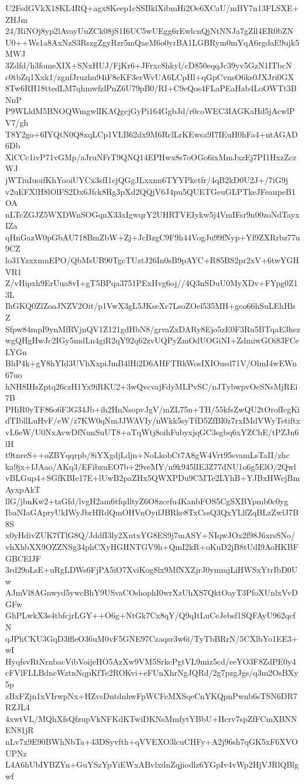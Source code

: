 U2FsdGVkX18KL4RQ+agx8Keep1cSSBklXibmHi2Oe6XCaU/mBY7n13FLSXE+ZHJm
24/RiNOj8yp2lAvayUuZCk08jS1I6UC5wUEgg6rEwlcnQjNtNNJa7gZll4ER0bZN
U0++Ws1a8AxNzS3RszgZgyRzr5mQaeM6o0yrBA1LGBRym0mYqA6rgdaE9ujk5MWJ
3Zdfd/h3fomeXIX+SNxHUJ/FjKr6+JFrxc8hkyl/cD850eqqJc39yv5GzN1ITbcN
c0tbZq1Xxk1/zgnfJruzhu94iF8eKF3erWvUA6LCpHl+qGpCvnsO6ks0JXJri0GX
8Tw6RH18ttedLM7qhmwfzlPnZ6U79pB0/RI+C9eQos4FLaPEaHab4LoOWTt3BNnP
P9WLldM5BNOQWmgwlIKAQgcjGyPi164GgbJd/r0coWEC3IAGKaHd5jAcwlPV7/gh
T8Y2go+6IYQtN0Q8xqLCp1VLB62dx9M6RclLrKEwsa9I7IEuH0hFa4+ntAGAD6Db
XlCCc1ivP71vGMp/aJruNFrT9QNQ14EPHwx8s7oOGo6ixMmJxzEj7PI1HxzZczWJ
jWTiuIuoifKhYooiUYCx3sfI1cjQGgJLxxnn6TYYPkctfr/4qB2kD0U2J+/7iG9j
v2uEFXlH8lOlFS2Dx6Jfck8Rg3pXd2QQjV6J4pu5QUETGeuGLPTkeJFeaupeB1OA
nLTcZGJZ5WXDWnSOGqnX33xIgwqrY2UHRTVEIykw5j4VmIFsr9n00zoNdTayxIZa
qHnGazW0pGbAU718BmZbW+Zj+JcBzgC9F9h44VogJu99fNyp+Yf9ZXRrbz77u9CZ
lo31YzxxmnEPO/QbMsUB90TgcTUztJ26In0sB9pAYC+R85BS2pr2xV+6twYGHVR1
Z/vHipxh9ErUua8vI+gT5BPqa3751PExHvg6oj//4Q3nSDuU0MyXDv+FYpg0Z13L
IhGKQ0ZlZoaJNZV2Oit/p1VwX3gL5JKseXc7LsoZOel535MH+gco66hSuLEhHlsZ
Sfpw84mpI9ynMfRVjnQV1Z121gdHbN8/grvaZxDARy8Ejo5zE0F3Ru5BTqaE3hez
wgQHgHwJc2IGy5mdLn4giR2qY92q62zvUQPyZmOdUOGiNI+ZdmiwGOi83FCeLYGn
BhP4k+gY8hYId3UVhXxpiJmB4lHi2D6AHFTRkWosIXIOusd71V/OlmI4wEWn67uo
hNH8IHsZptq26czH1Yx9iRKU2+3wQvcvajFdyMLPvSC/nJTybwpvOeSNsMjREi7B
PHiR0yTF86o6F3G34Jb+ih2HnNsopvJgV/mZL75n+TH/55kfsZwQU2tOrofIcgKi
dTIbllLuHvF/eW/z7KW0qNmJJWAVIy/nWkk5syTfD5ZfBl0z7rxIMdVWyTetiftx
vL6eW/U0NxAvwDfNunSuUT8+aTqWtj8oihFubyxjqGC3sgbq6xYZChE/tPZJn6lH
t9tnreS++oZBYqqrpb/8iYXgdjLdjn+NoLkobCt7A8gW4Vrt95svamLsTaII/zhc
ka9jx+IJAao/AKq3/EFibzuEO7b+29veMY/n9k945lIE3Z77dNU1o6g5ElO/2Qwl
vBLGup4+SGfKBIe17E+lUwB2paZHx5QWXPDu9CMTe2LYhB+YJBxHWcjBmAyxpAkT
llG/jbnKw2+tzGfd/lvgH2am6tfqdltyZ6O8zcefu4KanbFOS5CgSXBYpmb0c0yg
IbaNIaGApryUkIWyJbrHRdQmOHVnOyifJBRke8TxCssQ3QxYLlfZqBLzZwlJ7B8S
x0yHdivZUK7fTlG8Q/JddfI3ly2XutxYG8ES9j7mASY+NIqwJOx2f98J6xrsSNo/
vhXhbXX9OZZNSg34phCXyHGHNTGV9h+QmI2kR+oKuD2jB8tUdI9AoHKBFGBCElJF
3rd29oLsE+uRgLDWs6FjPA5iO7XviKog8lx9MfNXZjrJ0ymmjLiHWSxYtrIbD0Uw
AJmVl8AGnwyd5ywcBhY9USvaCOshophI0wrXzUhXS7QktOayT3PfoXUnlxVvDGFw
GhPLwkX3s4tbfcjrLGY++O6g+NtGk7Cx8qY/Q9qItLuCeJebsf1SQFAyU962qcfN
qJPhCKU3GqD3ffleO36uM0vF5GNE97Czaqsr3w6i/TyTbBRrN/5CXlbYo1EE3+wI
HyqfsvRtNrnbacVibVoijeHO5AzXw9VM5SrkcPgtVL9miz5cd/eeYO3F8ZdPE0y4
cFVlFLLBdncWztnNqpKfTe2ROKvi+eFUnXhrNgJQRd/2g7pzgJgs/q3m2OsBXy5p
zBxFZjn1xVIrwpNx+HZvsDntdnhwFpWCFeMXSqeCnYKQpnPwnb6sTSN6DR7RZJL4
4xwtVL/MQhXfsQfzupVkNFKdKTwiDKNsMmfytYBbU+Hcrv7spZfFCmXBNNEN81jR
nLv7x9E90BWhNbTa+43DSyvfth+qVVEXO3lcuCHFy+A2j96sh7qGK5xF6XVOUPNz
L4A6hUbIYBZYn+GuYSzYpYiEWxABvlxdnZqjiodlz6YGpIv4vWp2HjVJRlQBlgwf
